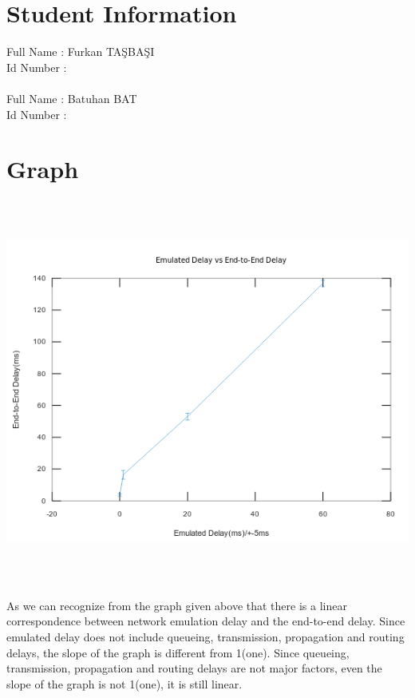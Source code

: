 \documentclass[12pt]{article}
\begin{document}
\section*{Student Information } 
Full Name : Furkan TAŞBAŞI \\ 	
Id Number : \\		
\\	
Full Name : Batuhan BAT \\
Id Number : \\

\section*{Graph}
\includegraphics[height=360pt]{graph.png}

As we can recognize from the graph given above that there is a linear correspondence between network emulation delay and the end-to-end delay. Since emulated delay does not include queueing, transmission, propagation and routing delays, the slope of the graph is different from 1(one). Since queueing, transmission, propagation and routing delays are not major factors, even the slope of the graph is not 1(one), it is still linear.
\end{document}
